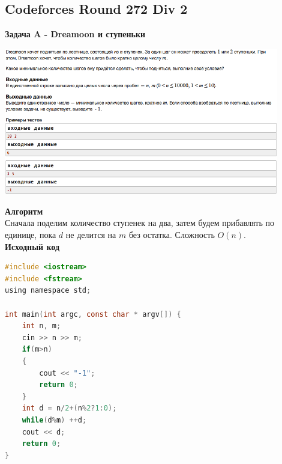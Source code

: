 \documentclass[a4paper,12pt]{article}
\begin{document}
%
%

\newpage
\subsection{Codeforces Round 272 Div 2}

\textbf{{\large Задача A - Dreamoon и ступеньки}} \\
\begin{center}
\includegraphics[width=0.9\textwidth]{C_272/C_272_A.png}\\ [1cm]
\end{center}
\textbf{{\large Алгоритм}} \\
Сначала поделим количество ступенек на два, затем будем прибавлять по единице, пока $d$ не делится на $m$ без остатка. Сложность $O(n)$. \\

\textbf{{\large Исходный код}}
\begin{lstlisting}[language=C]
#include <iostream>
#include <fstream>
using namespace std;

int main(int argc, const char * argv[]) {
    int n, m;
    cin >> n >> m;
    if(m>n)
    {
        cout << "-1";
        return 0;
    }
    int d = n/2+(n%2?1:0);
    while(d%m) ++d;
    cout << d;
    return 0;
}
\end{lstlisting}
\end{document}
